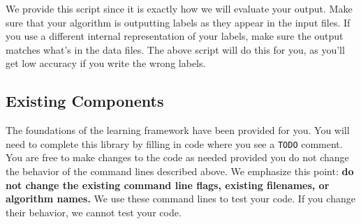 \documentclass[11pt]{article}
\begin{document}
	We provide this script since it is exactly how we will evaluate your output. Make sure that your algorithm is outputting labels as they appear in the input files. If you use a different internal representation of your labels, make sure the output matches what's in the data files. The above script will do this for you, as you'll get low accuracy if you write the wrong labels.
	
	\subsection{Existing Components}
	The foundations of the learning framework have been provided for you. You will need to complete this library by filling in code where you see a {\tt TODO} comment. You are free to make changes to the code as needed provided you do not change the behavior of the command lines described above. We emphasize this point: \textbf{do not change the existing command line flags, existing filenames, or algorithm names.} We use these command lines to test your code. If you change their behavior, we cannot test your code.
	
\end{document}

